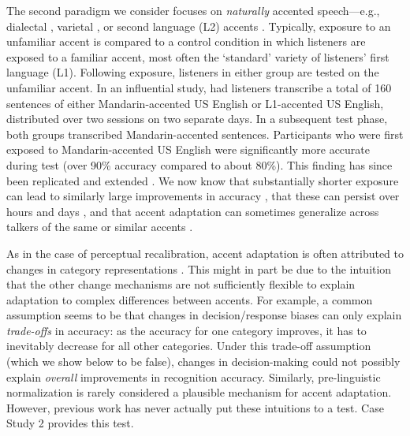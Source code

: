 \documentclass[
  11pt,
  man,floatsintext]{apa6}
\begin{document}
The second paradigm we consider focuses on \emph{naturally} accented speech---e.g., dialectal \autocite{smith2014}, varietal \autocite{shaw2018}, or second language (L2) accents \autocite{bradlow-bent2008,eisner2013,sidaras2009,weil2001a}. Typically, exposure to an unfamiliar accent is compared to a control condition in which listeners are exposed to a familiar accent, most often the `standard' variety of listeners' first language (L1). Following exposure, listeners in either group are tested on the unfamiliar accent. In an influential study, \textcite{bradlow-bent2008} had listeners transcribe a total of 160 sentences of either Mandarin-accented US English or L1-accented US English, distributed over two sessions on two separate days. In a subsequent test phase, both groups transcribed Mandarin-accented sentences. Participants who were first exposed to Mandarin-accented US English were significantly more accurate during test (over 90\% accuracy compared to about 80\%). This finding has since been replicated and extended \autocite[for review, see][]{baeseberk2020}. We now know that substantially shorter exposure can lead to similarly large improvements in accuracy \autocite[e.g., 80 sentences in a single session, about 2-5 minutes of speech,][]{xie2021jep}, that these can persist over hours and days \autocite{witteman2015,xie2018lcn}, and that accent adaptation can sometimes generalize across talkers of the same or similar accents \autocites[e.g.,][]{baeseberk2013,tzeng2016,xie2021jep}.

As in the case of perceptual recalibration, accent adaptation is often attributed to changes in category representations \autocites[e.g.,][]{bent-baeseberk2021,sidaras2009,eisner2013,sumner2009,tzeng2016,xie2016jep}. This might in part be due to the intuition that the other change mechanisms are not sufficiently flexible to explain adaptation to complex differences between accents. For example, a common assumption seems to be that changes in decision/response biases can only explain \emph{trade-offs} in accuracy: as the accuracy for one category improves, it has to inevitably decrease for all other categories. Under this trade-off assumption (which we show below to be false), changes in decision-making could not possibly explain \emph{overall} improvements in recognition accuracy. Similarly, pre-linguistic normalization is rarely considered a plausible mechanism for accent adaptation. However, previous work has never actually put these intuitions to a test. Case Study 2 provides this test.
\end{document}
